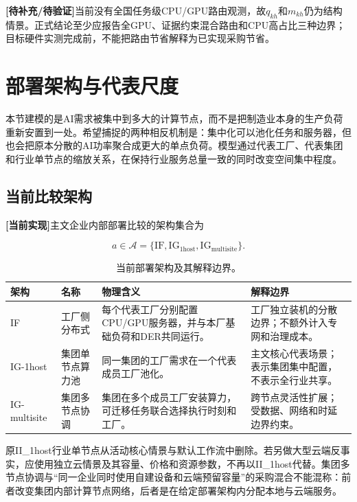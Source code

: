 \documentclass[preprint]{elsarticle}
\newcommand{\implemented}{\textcolor{green!40!black}{\textbf{[当前实现]}}}
\newcommand{\pending}{\textcolor{red!70!black}{\textbf{[待补充/待验证]}}}
\newcommand{\Aset}{\mathcal A}
\begin{document}
\pending 当前没有全国任务级CPU/GPU路由观测，故$q_{kh}$和$m_{kh}$仍为结构情景。正式结论至少应报告全GPU、证据约束混合路由和CPU高占比三种边界；目标硬件实测完成前，不能把路由节省解释为已实现采购节省。

\section{部署架构与代表尺度}

本节建模的是AI需求被集中到多大的计算节点，而不是把制造业本身的生产负荷重新安置到一处。希望捕捉的两种相反机制是：集中化可以池化任务和服务器，但也会把原本分散的AI功率聚合成更大的单点负荷。模型通过代表工厂、代表集团和行业单节点的缩放关系，在保持行业服务总量一致的同时改变空间集中程度。

\subsection{当前比较架构}

\implemented 主文企业内部部署比较的架构集合为

\begin{equation}
 a\in\Aset=\{\mathrm{IF},\mathrm{IG}_{1\mathrm{host}},\mathrm{IG}_{\mathrm{multisite}}\}.
 \label{eq:architectures}
\end{equation}

\begin{table}[htbp]
 \centering
 \caption{当前部署架构及其解释边界。}
 \label{tab:architectures}
 \begin{tabularx}{\textwidth}{p{2.0cm}p{3.1cm}X p{3.6cm}}
  \toprule
  架构 & 名称 & 物理含义 & 解释边界 \\
  \midrule
  IF & 工厂侧分布式 & 每个代表工厂分别配置CPU/GPU服务器，并与本厂基础负荷和DER共同运行。 & 工厂独立装机的分散边界；不额外计入专网和治理成本。 \\
  IG-1host & 集团单节点算力池 & 同一集团的工厂需求在一个代表成员工厂池化。 & 主文核心代表场景；表示集团集中配置，不表示全行业共享。 \\
  IG-multisite & 集团多节点协调 & 集团在多个成员工厂安装算力，可迁移任务联合选择执行时刻和工厂。 & 跨节点灵活性扩展；受数据、网络和时延边界约束。 \\
  \bottomrule
 \end{tabularx}
\end{table}

原II\_1host行业单节点从活动核心情景与默认工作流中删除。若另做大型云端反事实，应使用独立云情景及其容量、价格和资源参数，不再以II\_1host代替。集团多节点协调与“同一企业同时使用自建设备和云端预留容量”的采购混合不能混称：前者改变集团内部计算节点网络，后者是在给定部署架构内分配本地与云端服务。
\end{document}
